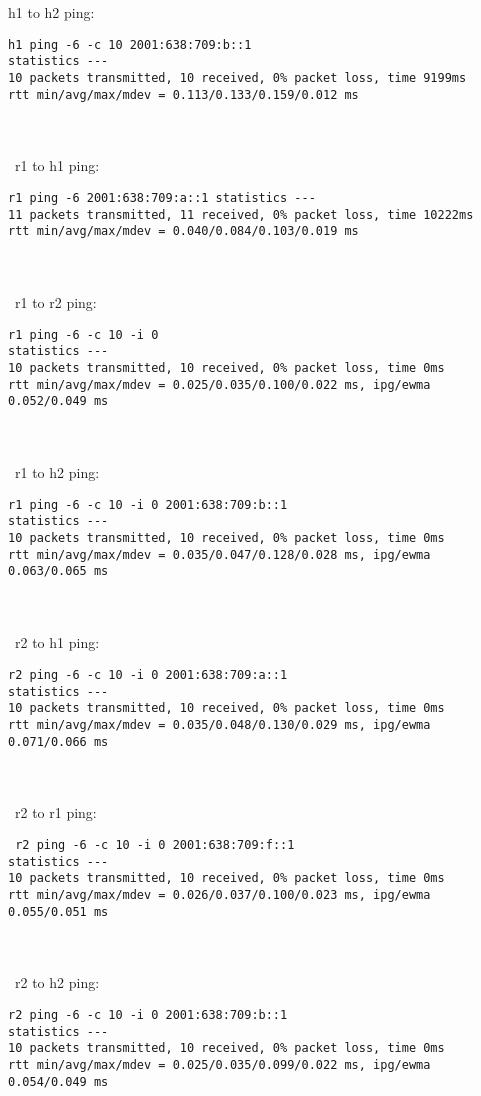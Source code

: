 \documentclass[a4paper]{article}
\begin{document}
h1 to h2 ping:
\begin{verbatim}
h1 ping -6 -c 10 2001:638:709:b::1  
statistics ---
10 packets transmitted, 10 received, 0% packet loss, time 9199ms
rtt min/avg/max/mdev = 0.113/0.133/0.159/0.012 ms
\end{verbatim}\\\\\
r1 to h1 ping:
\begin{verbatim}
r1 ping -6 2001:638:709:a::1 statistics ---
11 packets transmitted, 11 received, 0% packet loss, time 10222ms
rtt min/avg/max/mdev = 0.040/0.084/0.103/0.019 ms
\end{verbatim}\\\\\
r1 to r2 ping:
\begin{verbatim}
r1 ping -6 -c 10 -i 0 
statistics ---
10 packets transmitted, 10 received, 0% packet loss, time 0ms
rtt min/avg/max/mdev = 0.025/0.035/0.100/0.022 ms, ipg/ewma 0.052/0.049 ms
\end{verbatim}\\\\\
r1 to h2 ping:
\begin{verbatim}
r1 ping -6 -c 10 -i 0 2001:638:709:b::1
statistics ---
10 packets transmitted, 10 received, 0% packet loss, time 0ms
rtt min/avg/max/mdev = 0.035/0.047/0.128/0.028 ms, ipg/ewma 0.063/0.065 ms
\end{verbatim}\\\\\
r2 to h1 ping:
\begin{verbatim}
r2 ping -6 -c 10 -i 0 2001:638:709:a::1
statistics ---
10 packets transmitted, 10 received, 0% packet loss, time 0ms
rtt min/avg/max/mdev = 0.035/0.048/0.130/0.029 ms, ipg/ewma 0.071/0.066 ms
\end{verbatim}\\\\\
r2 to r1 ping:
\begin{verbatim}
 r2 ping -6 -c 10 -i 0 2001:638:709:f::1
statistics ---
10 packets transmitted, 10 received, 0% packet loss, time 0ms
rtt min/avg/max/mdev = 0.026/0.037/0.100/0.023 ms, ipg/ewma 0.055/0.051 ms
\end{verbatim}\\\\\
r2 to h2 ping:
\begin{verbatim}
r2 ping -6 -c 10 -i 0 2001:638:709:b::1
statistics ---
10 packets transmitted, 10 received, 0% packet loss, time 0ms
rtt min/avg/max/mdev = 0.025/0.035/0.099/0.022 ms, ipg/ewma 0.054/0.049 ms
\end{verbatim}\\\\\
\end{document}
